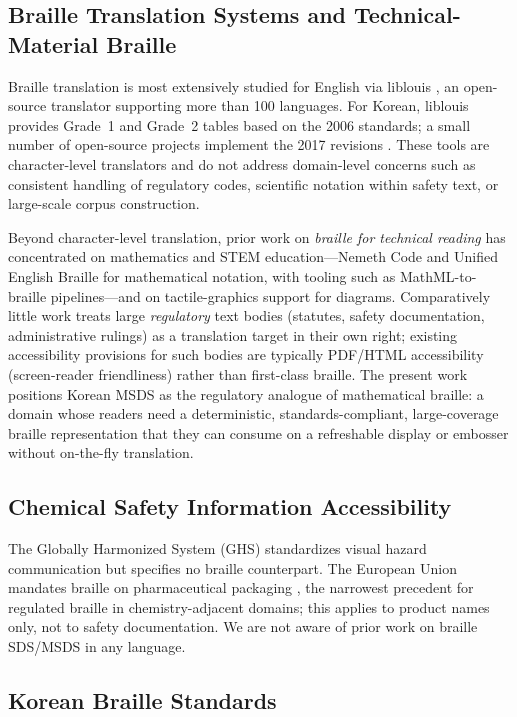 \documentclass[smallextended]{svjour3}
\begin{document}
\subsection{Braille Translation Systems and Technical-Material Braille}

Braille translation is most extensively studied for English via liblouis \cite{liblouis}, an open-source translator supporting more than 100 languages. For Korean, liblouis provides Grade~1 and Grade~2 tables based on the 2006 standards; a small number of open-source projects implement the 2017 revisions \cite{hangul_braille_converter,hanbraille}. These tools are character-level translators and do not address domain-level concerns such as consistent handling of regulatory codes, scientific notation within safety text, or large-scale corpus construction.

Beyond character-level translation, prior work on \emph{braille for technical reading} has concentrated on mathematics and STEM education---Nemeth Code and Unified English Braille for mathematical notation, with tooling such as MathML-to-braille pipelines---and on tactile-graphics support for diagrams. Comparatively little work treats large \emph{regulatory} text bodies (statutes, safety documentation, administrative rulings) as a translation target in their own right; existing accessibility provisions for such bodies are typically PDF/HTML accessibility (screen-reader friendliness) rather than first-class braille. The present work positions Korean MSDS as the regulatory analogue of mathematical braille: a domain whose readers need a deterministic, standards-compliant, large-coverage braille representation that they can consume on a refreshable display or embosser without on-the-fly translation.

\subsection{Chemical Safety Information Accessibility}

The Globally Harmonized System (GHS) \cite{ghs} standardizes visual hazard communication but specifies no braille counterpart. The European Union mandates braille on pharmaceutical packaging \cite{eu_braille}, the narrowest precedent for regulated braille in chemistry-adjacent domains; this applies to product names only, not to safety documentation. We are not aware of prior work on braille SDS/MSDS in any language.

\subsection{Korean Braille Standards}
\end{document}
